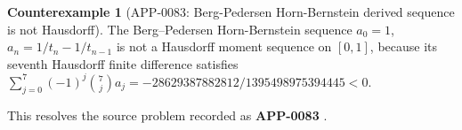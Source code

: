 \documentclass[11pt]{article}
\numberwithin{equation}{section}
\theoremstyle{definition}
\newtheorem{counterexample}[theorem]{Counterexample}
\theoremstyle{remark}
\newcommand{\1}{\mathbf 1}
\begin{document}
\begin{counterexample}[APP-0083: Berg-Pedersen Horn-Bernstein derived sequence is not Hausdorff]
\label{res:bergpedersen-hornbernstein-a-nothausdorff}
The Berg--Pedersen Horn-Bernstein sequence \(a_0=1\), \(a_n=1/t_n-1/t_{n-1}\) is not a Hausdorff moment sequence on \([0,1]\), because its seventh Hausdorff finite difference satisfies \(\sum_{j=0}^7(-1)^j\binom7j a_j=-28629387882812/1395498975394445<0\).



This resolves the source problem recorded as \textbf{APP-0083} \cite{app-app-0083-source}.
\end{counterexample}
\end{document}
